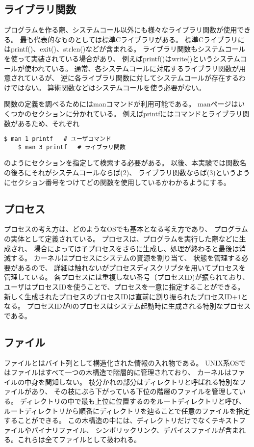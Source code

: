 \documentclass[12pt]{jarticle}
\begin{document}
\subsection{ライブラリ関数}
プログラムを作る際、システムコール以外にも様々なライブラリ関数が使用できる。
最も代表的なものとしては標準Cライブラリがある。
標準Cライブラリにはprintf()、exit()、strlen()などが含まれる。
ライブラリ関数もシステムコールを使って実装されている場合があり、
例えばprintf()はwrite()というシステムコールが使われている。
通常、各システムコールに対応するライブラリ関数が用意されているが、
逆に各ライブラリ関数に対してシステムコールが存在するわけではない。
算術関数などはシステムコールを使う必要がない。

関数の定義を調べるためにはmanコマンドが利用可能である。
manページはいくつかのセクションに分かれている。
例えばprintfにはコマンドとライブラリ関数があるため、それぞれ
\begin{lstlisting}[style = lstbash]
    $ man 1 printf   # ユーザコマンド
    $ man 3 printf   # ライブラリ関数
\end{lstlisting}
のようにセクションを指定して検索する必要がある。
以後、本実験では関数名の後ろにそれがシステムコールならば(2)、
ライブラリ関数ならば(3)というようにセクション番号をつけてどの関数を使用しているかわかるようにする。

\subsection{プロセス}
プロセスの考え方は、どのようなOSでも基本となる考え方であり、
プログラムの実体として定義されている。
プロセスは、プログラムを実行した際などに生成され、
場合によっては子プロセスをさらに生成し、処理が終わると最後は消滅する。
カーネルはプロセスにシステムの資源を割り当て、
状態を管理する必要があるので、
詳細は触れないがプロセスディスクリプタを用いてプロセスを管理している。
各プロセスには重複しない番号（プロセスID)が振られており、
ユーザはプロセスIDを使うことで、プロセスを一意に指定することができる。
新しく生成されたプロセスのプロセスIDは直前に割り振られたプロセスID$+1$となる。
プロセスIDが$0$のプロセスはシステム起動時に生成される特別なプロセスである。

\subsection{ファイル}
ファイルとはバイト列として構造化された情報の入れ物である。
UNIX系OSではファイルはすべて一つの木構造で階層的に管理されており、
カーネルはファイルの中身を関知しない。
枝分かれの部分はディレクトリと呼ばれる特別なファイルがあり、
その枝にぶら下がっている下位の階層のファイルを管理している。
ディレクトリの中で最も上位に位置するのをルートディレクトリと呼び、
ルートディレクトリから順番にディレクトリを辿ることで任意のファイルを指定することができる。
この木構造の中には、ディレクトリだけでなくテキストファイルやバイナリファイル、
シンボリックリンク、デバイスファイルが含まれる。これらは全てファイルとして扱われる。
\end{document}

